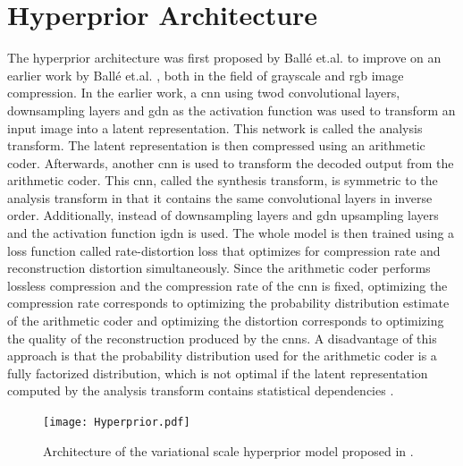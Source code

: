 \section{Hyperprior Architecture}
The hyperprior architecture was first proposed by Ballé et.al. \citep{balle_variational_2018} to improve on an earlier work by Ballé et.al. \citep{balle_end--end_2017}, both in the field of grayscale and \ac{rgb} image compression. In the earlier work, a \ac{cnn} using \ac{twod} convolutional layers, downsampling layers and \ac{gdn} as the activation function was used to transform an input image into a latent representation. This network is called the analysis transform. The latent representation is then compressed using an arithmetic coder. Afterwards, another \ac{cnn} is used to transform the decoded output from the arithmetic coder. This \ac{cnn}, called the synthesis transform, is symmetric to the analysis transform in that it contains the same convolutional layers in inverse order. Additionally, instead of downsampling layers and \ac{gdn} upsampling layers and the activation function \ac{igdn} is used. The whole model is then trained using a loss function called rate-distortion loss that optimizes for compression rate and reconstruction distortion simultaneously. Since the arithmetic coder performs lossless compression and the compression rate of the \ac{cnn} is fixed, optimizing the compression rate corresponds to optimizing the probability distribution estimate of the arithmetic coder and optimizing the distortion corresponds to optimizing the quality of the reconstruction produced by the \acp{cnn}. A disadvantage of this approach is that the probability distribution used for the arithmetic coder is a fully factorized distribution, which is not optimal if the latent representation computed by the analysis transform contains statistical dependencies \citep{balle_variational_2018}.

\begin{figure}
\centering
\texttt{[image: Hyperprior.pdf]}
\caption[Scale hyperprior architecture]{Architecture of the variational scale hyperprior model proposed in \citep{balle_variational_2018}.}
\label{fig:hyperprior}
\end{figure}

